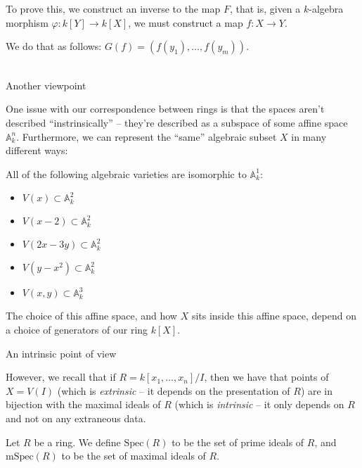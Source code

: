 \documentclass{beamer}
\begin{document}
\begin{frame}
To prove this, we construct an inverse to the map $F$, that is, given a $k$-algebra morphism $\varphi:k[Y]\to k[X]$, we must construct a map $f:X\to Y$.

We do that as follows: $G(f)=(f(y_1),\dots, f(y_m))$.  \\~\\







\end{frame}



\begin{frame}{Another viewpoint}

One issue with our correspondence between rings is that the spaces aren't described ``instrinsically'' -- they're described as a subspace of some affine space $\mathbb{A}^n_k$.  Furthermore, we can represent the ``same'' algebraic subset $X$ in many different ways:

\begin{example} All of the following algebraic varieties are isomorphic to $\mathbb{A}^1_k$:
\begin{itemize}
\item $V(x)\subset \mathbb{A}^2_k$
\item $V(x-2)\subset \mathbb{A}^2_k$
\item $V(2x-3y)\subset \mathbb{A}^2_k$
\item $V(y-x^2)\subset \mathbb{A}^2_k$
\item $V(x,y)\subset \mathbb{A}^3_k$
\end{itemize}
\end{example}
The choice of this affine space, and how $X$ sits inside this affine space, depend on a choice of generators of our ring $k[X]$.




\end{frame}


\begin{frame}{An intrinsic point of view}

However, we recall that if $R=k[x_1,\dots, x_n]/I$, then we have that points of $X=V(I)$ (which is \emph{extrinsic} -- it depends on the presentation of $R$) are in bijection with the maximal ideals of $R$ (which is \emph{intrinsic} -- it only depends on $R$ and not on any extraneous data.

\begin{definition}
Let $R$ be a ring.  We define $\text{Spec}(R)$ to be the set of prime ideals of $R$, and $\text{mSpec}(R)$ to be the set of maximal ideals of $R$.
\end{definition}

\end{frame}
\end{document}
